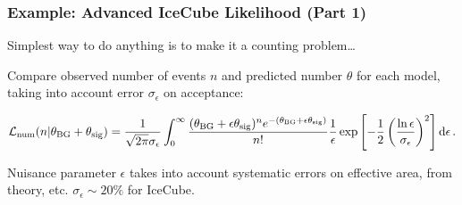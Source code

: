 \documentclass[xcolor=dvipsnames]{beamer}
\newcommand{\Like}{\mathcal{L}}
\begin{document}
\begin{frame}
\frametitle{Example: Advanced IceCube Likelihood (Part 1)}

Simplest way to do anything is to make it a counting problem\ldots
\vspace{5mm}

Compare observed number of events $n$ and predicted number $\theta$ for each model, taking into account error $\sigma_\epsilon$ on acceptance:

\begin{equation}
\label{fancy}
\scriptsize
\Like_\mathrm{num}(n|\theta_\mathrm{BG}+\theta_\mathrm{sig}) = \frac{1}{\sqrt{2\pi}\sigma_\epsilon}\int_0^\infty \frac{(\theta_\mathrm{BG}+\epsilon\theta_\mathrm{sig})^{n}e^{-(\theta_\mathrm{BG}+\epsilon\theta_\mathrm{sig})}}{n!}\frac1\epsilon\exp\left[-\frac{1}{2}\left(\frac{\ln\epsilon}{\sigma_\epsilon}\right)^2\right]\mathrm{d}\epsilon \, .
\end{equation}

\vspace{3mm}
Nuisance parameter $\epsilon$ takes into account systematic errors on effective area, from theory, etc.  $\sigma_\epsilon\sim20\%$ for IceCube.

\end{frame}
\end{document}
